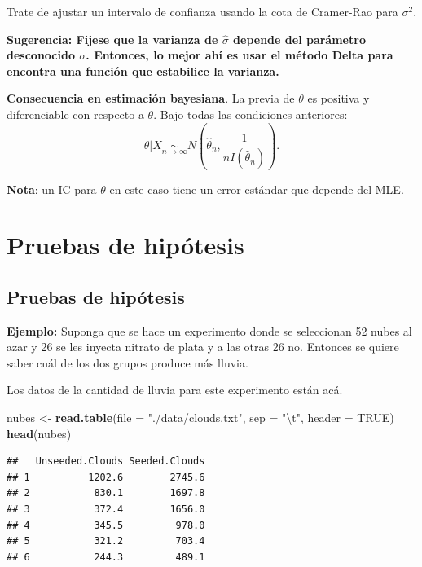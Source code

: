 \documentclass[
  12pt,
]{book}
\newenvironment{Shaded}{\begin{snugshade}}{\end{snugshade}}
\newcommand{\CharTok}[1]{\textcolor[rgb]{0.31,0.60,0.02}{#1}}
\newcommand{\DataTypeTok}[1]{\textcolor[rgb]{0.13,0.29,0.53}{#1}}
\newcommand{\KeywordTok}[1]{\textcolor[rgb]{0.13,0.29,0.53}{\textbf{#1}}}
\newcommand{\NormalTok}[1]{#1}
\newcommand{\OtherTok}[1]{\textcolor[rgb]{0.56,0.35,0.01}{#1}}
\newcommand{\StringTok}[1]{\textcolor[rgb]{0.31,0.60,0.02}{#1}}
\begin{document}
Trate de ajustar un intervalo de confianza usando la cota de Cramer-Rao para \(\sigma^2\).

\textbf{Sugerencia: Fijese que la varianza de \(\hat\sigma\) depende del parámetro
desconocido \(\sigma\). Entonces, lo mejor ahí es usar el método Delta para
encontra una función que estabilice la varianza. }

\textbf{Consecuencia en estimación bayesiana}. La previa de \(\theta\) es positiva y diferenciable con respecto a \(\theta\). Bajo todas las condiciones anteriores:
\[\theta|X\underset{n\to\infty}{\sim} N\left(\hat\theta_n,\dfrac 1{nI(\hat\theta_n)}\right).\]

\textbf{Nota}: un IC para \(\theta\) en este caso tiene un error estándar que depende del MLE.

\hypertarget{pruebas-de-hipuxf3tesis}{%
\chapter{Pruebas de hipótesis}\label{pruebas-de-hipuxf3tesis}}

\hypertarget{pruebas-de-hipuxf3tesis-1}{%
\section{Pruebas de hipótesis}\label{pruebas-de-hipuxf3tesis-1}}

\textbf{Ejemplo:} Suponga que se hace un experimento donde se seleccionan 52 nubes al
azar y 26 se les inyecta nitrato de plata y a las otras 26 no. Entonces se
quiere saber cuál de los dos grupos produce más lluvia.

Los datos de la cantidad de lluvia para este experimento están acá.

\begin{Shaded}
\begin{Highlighting}[]
\NormalTok{nubes \textless{}{-}}\StringTok{ }\KeywordTok{read.table}\NormalTok{(}\DataTypeTok{file =} \StringTok{"./data/clouds.txt"}\NormalTok{, }\DataTypeTok{sep =} \StringTok{"}\CharTok{\textbackslash{}t}\StringTok{"}\NormalTok{, }\DataTypeTok{header =} \OtherTok{TRUE}\NormalTok{)}
\KeywordTok{head}\NormalTok{(nubes)}
\end{Highlighting}
\end{Shaded}

\begin{verbatim}
##   Unseeded.Clouds Seeded.Clouds
## 1          1202.6        2745.6
## 2           830.1        1697.8
## 3           372.4        1656.0
## 4           345.5         978.0
## 5           321.2         703.4
## 6           244.3         489.1
\end{verbatim}
\end{document}
